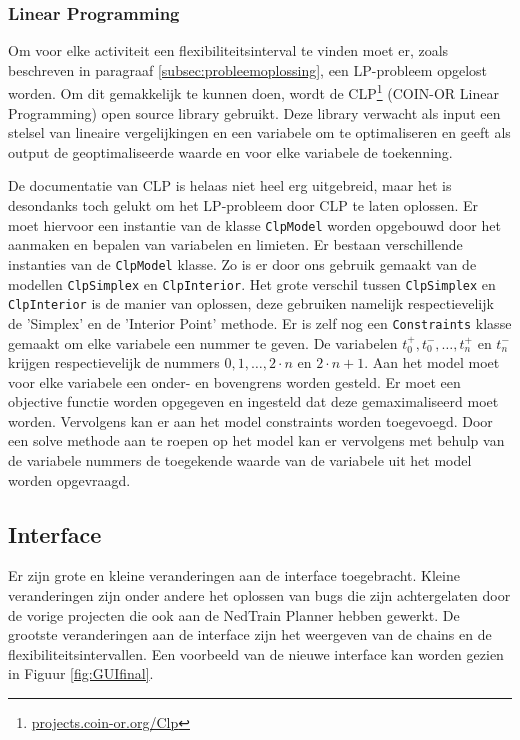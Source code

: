 \subsubsection{Linear Programming}
Om voor elke activiteit een flexibiliteitsinterval te vinden moet er, zoals beschreven in paragraaf \ref{subsec:probleemoplossing}, een LP-probleem opgelost worden. Om dit gemakkelijk te kunnen doen, wordt de CLP\footnote{\href{https://projects.coin-or.org/Clp}{projects.coin-or.org/Clp}} (COIN-OR Linear Programming) open source library gebruikt. Deze library verwacht als input een stelsel van lineaire vergelijkingen en een variabele om te optimaliseren en geeft als output de geoptimaliseerde waarde en voor elke variabele de toekenning.

De documentatie van CLP is helaas niet heel erg uitgebreid, maar het is desondanks toch gelukt om het LP-probleem door CLP te laten oplossen. Er moet hiervoor een instantie van de klasse \texttt{ClpModel} worden opgebouwd door het aanmaken en bepalen van variabelen en limieten. Er bestaan verschillende instanties van de \texttt{ClpModel} klasse. Zo is er door ons gebruik gemaakt van de modellen \texttt{ClpSimplex} en \texttt{ClpInterior}. Het grote verschil tussen \texttt{ClpSimplex} en \texttt{ClpInterior} is de manier van oplossen, deze gebruiken namelijk respectievelijk de 'Simplex' en de 'Interior Point' methode. Er is zelf nog een \texttt{Constraints} klasse gemaakt om elke variabele een nummer te geven. De variabelen $t^+_0, t^-_0, \ldots, t^+_n$ en $t^-_n$ krijgen respectievelijk de nummers $0, 1, \ldots, 2 \cdot n$ en $2 \cdot n + 1$. Aan het model moet voor elke variabele een onder- en bovengrens worden gesteld. Er moet een objective functie worden opgegeven en ingesteld dat deze gemaximaliseerd moet worden. Vervolgens kan er aan het model constraints worden toegevoegd. Door een solve methode aan te roepen op het model kan er vervolgens met behulp van de variabele nummers de toegekende waarde van de variabele uit het model worden opgevraagd.

\subsection{Interface}
Er zijn grote en kleine veranderingen aan de interface toegebracht. Kleine veranderingen zijn onder andere het oplossen van bugs die zijn achtergelaten door de vorige projecten die ook aan de NedTrain Planner hebben gewerkt. De grootste veranderingen aan de interface zijn het weergeven van de chains en de flexibiliteitsintervallen. Een voorbeeld van de nieuwe interface kan worden gezien in Figuur \ref{fig:GUIfinal}.

